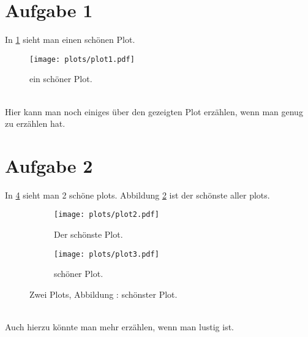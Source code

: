 \documentclass{scrartcl}
\begin{document}
\section{Aufgabe 1}
In \ref{fig:plt1} sieht man einen schönen Plot.
\begin{figure}
  \centering
  \texttt{[image: plots/plot1.pdf]}
  \caption{ein schöner Plot.}
  \label{fig:plt1}
\end{figure}
\\
Hier kann man noch einiges über den gezeigten Plot erzählen,
wenn man genug zu erzählen hat.
\newpage
\section{Aufgabe 2}
In \ref{fig:2} sieht man 2 schöne plots. Abbildung \ref{fig:2a}
ist der schönste aller plots.
\begin{figure}
  \centering
  \begin{subfigure}{0.48\textwidth}
    \centering
    \texttt{[image: plots/plot2.pdf]}
    \caption{Der schönste Plot.}
    \label{fig:2a}
  \end{subfigure}
  \begin{subfigure}{0.48\textwidth}
    \centering
    \texttt{[image: plots/plot3.pdf]}
    \caption{schöner Plot.}
    \label{fig:2b}
  \end{subfigure}
  \caption{Zwei Plots, Abbildung : schönster Plot.}
  \label{fig:2}
\end{figure}
\\
Auch hierzu könnte man mehr erzählen, wenn man lustig ist.
\end{document}

